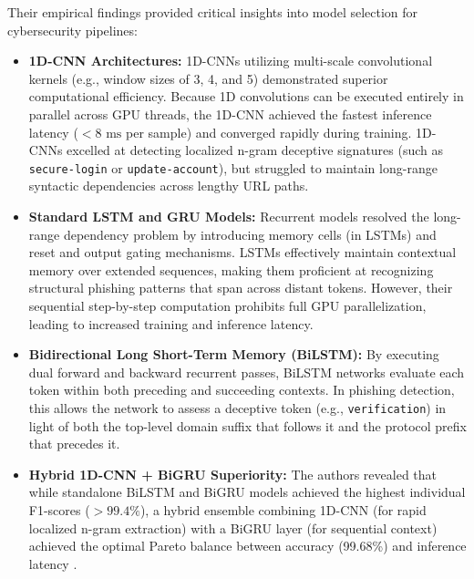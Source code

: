 Their empirical findings provided critical insights into model selection for cybersecurity pipelines:
\begin{itemize}
\item \textbf{1D-CNN Architectures:} 1D-CNNs utilizing multi-scale convolutional kernels (e.g., window sizes of 3, 4, and 5) demonstrated superior computational efficiency. Because 1D convolutions can be executed entirely in parallel across GPU threads, the 1D-CNN achieved the fastest inference latency ($< 8\text{ ms}$ per sample) and converged rapidly during training. 1D-CNNs excelled at detecting localized n-gram deceptive signatures (such as \texttt{secure-login} or \texttt{update-account}), but struggled to maintain long-range syntactic dependencies across lengthy URL paths.
\item \textbf{Standard LSTM and GRU Models:} Recurrent models resolved the long-range dependency problem by introducing memory cells (in LSTMs) and reset and output gating mechanisms. LSTMs effectively maintain contextual memory over extended sequences, making them proficient at recognizing structural phishing patterns that span across distant tokens. However, their sequential step-by-step computation prohibits full GPU parallelization, leading to increased training and inference latency.
\item \textbf{Bidirectional Long Short-Term Memory (BiLSTM):} By executing dual forward and backward recurrent passes, BiLSTM networks evaluate each token within both preceding and succeeding contexts. In phishing detection, this allows the network to assess a deceptive token (e.g., \texttt{verification}) in light of both the top-level domain suffix that follows it and the protocol prefix that precedes it.
\item \textbf{Hybrid 1D-CNN + BiGRU Superiority:} The authors revealed that while standalone BiLSTM and BiGRU models achieved the highest individual F1-scores ($> 99.4\%$), a hybrid ensemble combining 1D-CNN (for rapid localized n-gram extraction) with a BiGRU layer (for sequential context) achieved the optimal Pareto balance between accuracy (99.68\%) and inference latency \cite{4}.
\end{itemize}

